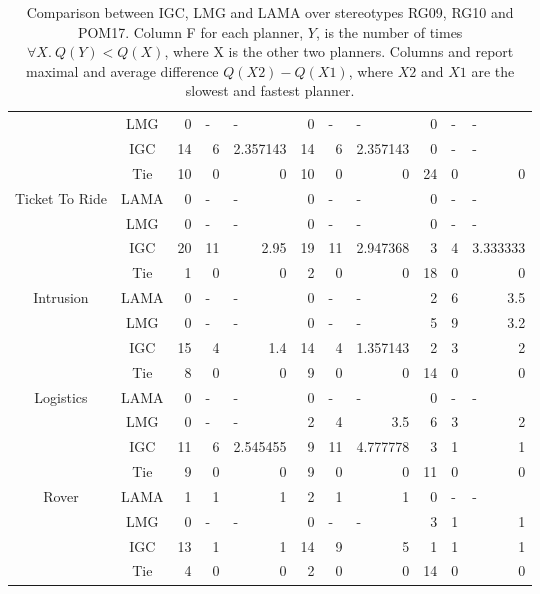 \documentclass{article}
\begin{document}
\begin{table}[htbp]
\begin{tabular}{|c|c|r|r|r|r|r|r|r|r|r|}
&LMG & 0 & \multicolumn{1}{l|}{-} & \multicolumn{1}{l|}{-} & 0 & \multicolumn{1}{l|}{-} & \multicolumn{1}{l|}{-} & 0 & \multicolumn{1}{l|}{-} & \multicolumn{1}{l|}{-} \\
&IGC & 14 & 6 & 2.357143 & 14 & 6 & 2.357143 & 0 & \multicolumn{1}{l|}{-} & \multicolumn{1}{l|}{-} \\ 
&Tie & 10 & 0 & 0 & 10 & 0 & 0 & 24 & 0 & 0 \\ \hline
\multirow{ 4}{*}{Ticket To Ride} & LAMA & 0 & \multicolumn{1}{l|}{-} & \multicolumn{1}{l|}{-} & 0 & \multicolumn{1}{l|}{-} & \multicolumn{1}{l|}{-} & 0 & \multicolumn{1}{l|}{-} & \multicolumn{1}{l|}{-} \\
&LMG & 0 & \multicolumn{1}{l|}{-} & \multicolumn{1}{l|}{-} & 0 & \multicolumn{1}{l|}{-} & \multicolumn{1}{l|}{-} & 0 & \multicolumn{1}{l|}{-} & \multicolumn{1}{l|}{-} \\
&IGC & 20 & 11 & 2.95 & 19 & 11 & 2.947368 & 3 & 4 & 3.333333 \\
&Tie & 1 & 0 & 0 & 2 & 0 & 0 & 18 & 0 & 0 \\ \hline
\multirow{ 4}{*}{Intrusion} & LAMA & 0 & \multicolumn{1}{l|}{-} & \multicolumn{1}{l|}{-} & 0 & \multicolumn{1}{l|}{-} & \multicolumn{1}{l|}{-} & 2 & 6 & 3.5 \\
&LMG & 0 & \multicolumn{1}{l|}{-} & \multicolumn{1}{l|}{-} & 0 & \multicolumn{1}{l|}{-} & \multicolumn{1}{l|}{-} & 5 & 9 & 3.2 \\
&IGC & 15 & 4 & 1.4 & 14 & 4 & 1.357143 & 2 & 3 & 2 \\
&Tie & 8 & 0 & 0 & 9 & 0 & 0 & 14 & 0 & 0 \\ \hline
\multirow{ 4}{*}{Logistics} & LAMA & 0 & \multicolumn{1}{l|}{-} & \multicolumn{1}{l|}{-} & 0 & \multicolumn{1}{l|}{-} & \multicolumn{1}{l|}{-} & 0 & \multicolumn{1}{l|}{-} & \multicolumn{1}{l|}{-} \\
&LMG & 0 & \multicolumn{1}{l|}{-} & \multicolumn{1}{l|}{-} & 2 & 4 & 3.5 & 6 & 3 & 2 \\
&IGC & 11 & 6 & 2.545455 & 9 & 11 & 4.777778 & 3 & 1 & 1 \\
&Tie & 9 & 0 & 0 & 9 & 0 & 0 & 11 & 0 & 0 \\ \hline
\multirow{ 4}{*}{Rover} & LAMA & 1 & 1 & 1 & 2 & 1 & 1 & 0 & \multicolumn{1}{l|}{-} & \multicolumn{1}{l|}{-} \\
&LMG & 0 & \multicolumn{1}{l|}{-} & \multicolumn{1}{l|}{-} & 0 & \multicolumn{1}{l|}{-} & \multicolumn{1}{l|}{-} & 3 & 1 & 1 \\
&IGC & 13 & 1 & 1 & 14 & 9 & 5 & 1 & 1 & 1 \\
&Tie & 4 & 0 & 0 & 2 & 0 & 0 & 14 & 0 & 0 \\ \hline
\end{tabular}
\label{all}
\caption{Comparison between IGC, LMG and LAMA over stereotypes
RG09, RG10 and POM17. Column F for each planner, $Y$, is the number of times
$\forall X.\ Q(Y) < Q(X)$, where X is the other two planners. Columns and
report maximal and average difference $Q(X2) - Q(X1)$, where
$X2$ and $X1$ are the slowest and fastest planner.}
\end{table}
\end{document}
